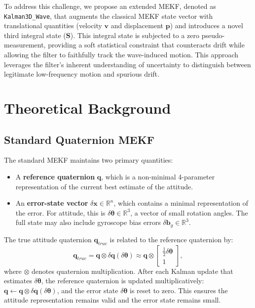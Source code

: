 \documentclass[11pt]{article}
\begin{document}
To address this challenge, we propose an extended MEKF, denoted as \texttt{Kalman3D\_Wave}, that augments the classical MEKF state vector with translational quantities (velocity $\bm{v}$ and displacement $\bm{p}$) and introduces a novel third integral state ($\bm{S}$). This integral state is subjected to a zero pseudo-measurement, providing a soft statistical constraint that counteracts drift while allowing the filter to faithfully track the wave-induced motion. This approach leverages the filter's inherent understanding of uncertainty to distinguish between legitimate low-frequency motion and spurious drift.

\section{Theoretical Background}
\label{sec:theory}

\subsection{Standard Quaternion MEKF}
The standard MEKF maintains two primary quantities:
\begin{itemize}
    \item A \textbf{reference quaternion} $\bm{q}$, which is a non-minimal 4-parameter representation of the current best estimate of the attitude.
    \item An \textbf{error-state vector} $\delta \bm{x} \in \mathbb{R}^{n}$, which contains a minimal representation of the error. For attitude, this is $\delta \bm{\theta} \in \mathbb{R}^3$, a vector of small rotation angles. The full state may also include gyroscope bias errors $\delta \bm{b}_g \in \mathbb{R}^3$.
\end{itemize}
The true attitude quaternion $\bm{q}_{true}$ is related to the reference quaternion by:
\begin{equation}
\bm{q}_{true} = \bm{q} \otimes \delta \bm{q}(\delta \bm{\theta}) \approx \bm{q} \otimes \begin{bmatrix} \frac{1}{2}\delta \bm{\theta} \\ 1 \end{bmatrix},
\end{equation}
where $\otimes$ denotes quaternion multiplication. After each Kalman update that estimates $\delta \bm{\theta}$, the reference quaternion is updated multiplicatively: $\bm{q} \leftarrow \bm{q} \otimes \delta \bm{q}(\delta \bm{\theta})$, and the error state $\delta \bm{\theta}$ is reset to zero. This ensures the attitude representation remains valid and the error state remains small.
\end{document}
